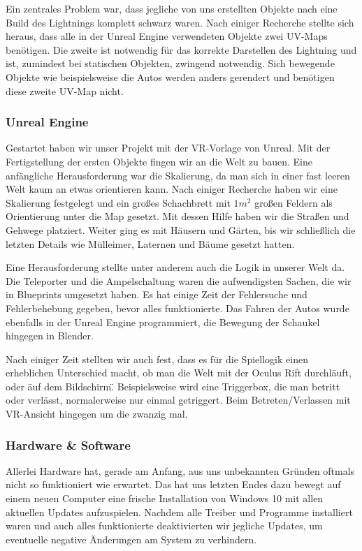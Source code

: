 \documentclass{Bericht}
\begin{document}
			Ein zentrales Problem war, dass jegliche von uns erstellten Objekte nach eine Build des Lightnings komplett schwarz waren. Nach einiger Recherche stellte sich heraus, dass alle in der Unreal Engine verwendeten Objekte zwei UV-Maps benötigen. Die zweite ist notwendig für das korrekte Darstellen des Lightning und ist, zumindest bei statischen Objekten, zwingend notwendig. Sich bewegende Objekte wie beispielsweise die Autos werden anders gerendert und benötigen diese zweite UV-Map nicht. 
		
		\subsubsection{Unreal Engine}
			Gestartet haben wir unser Projekt mit der VR-Vorlage von Unreal. Mit der Fertigstellung der ersten Objekte fingen wir an die Welt zu bauen. Eine anfängliche Herausforderung war die Skalierung, da man sich in einer fast leeren Welt kaum an etwas orientieren kann. Nach einiger Recherche haben wir eine Skalierung festgelegt und ein großes Schachbrett mit $1m^{2}$ großen Feldern als Orientierung unter die Map gesetzt. Mit dessen Hilfe haben wir die Straßen und Gehwege platziert. Weiter ging es mit Häusern und Gärten, bis wir schließlich die letzten Details wie Mülleimer, Laternen und Bäume gesetzt hatten. 
			
			Eine Herausforderung stellte unter anderem auch die Logik in unserer Welt da. Die Teleporter und die Ampelschaltung waren die aufwendigsten Sachen, die wir in Blueprints umgesetzt haben. Es hat einige Zeit der Fehlersuche und Fehlerbehebung gegeben, bevor alles funktionierte. Das Fahren der Autos wurde ebenfalls in der Unreal Engine programmiert, die Bewegung der Schaukel hingegen in Blender.
			
			Nach einiger Zeit stellten wir auch fest, dass es für die Spiellogik einen erheblichen Unterschied macht, ob man die Welt mit der Oculus Rift durchläuft, oder \"auf dem Bildschirm\". Beispielsweise wird eine Triggerbox, die man betritt oder verlässt, normalerweise nur einmal getriggert. Beim Betreten/Verlassen mit VR-Ansicht hingegen um die zwanzig mal.
		
		\subsubsection{Hardware \& Software}
			Allerlei Hardware hat, gerade am Anfang, aus uns unbekannten Gründen oftmals nicht so funktioniert wie erwartet. Das hat uns letzten Endes dazu bewegt auf einem neuen Computer eine frische Installation von Windows 10 mit allen aktuellen Updates aufzuspielen. Nachdem alle Treiber und Programme installiert waren und auch alles funktionierte deaktivierten wir jegliche Updates, um eventuelle negative Änderungen am System zu verhindern. 
			
\end{document}
